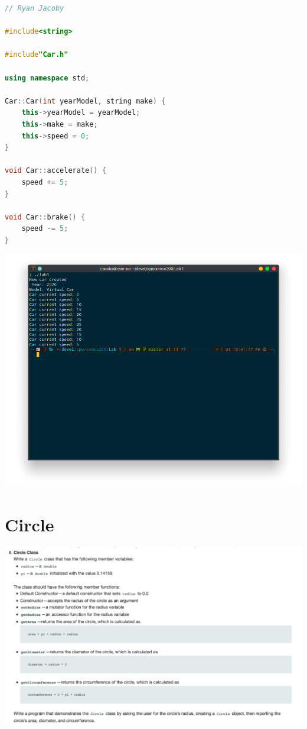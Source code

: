 \documentclass[letterpaper, 11pt]{article}
\begin{document}
\begin{lstlisting}[language=C++, caption=CarImp.cpp]
// Ryan Jacoby

#include<string>

#include"Car.h"

using namespace std;

Car::Car(int yearModel, string make) {
    this->yearModel = yearModel;
    this->make = make;
    this->speed = 0;
}

void Car::accelerate() {
    speed += 5;
}

void Car::brake() {
    speed -= 5;
}
\end{lstlisting}

\includegraphics[scale=0.5]{car_run.png} 

\section{Circle}

\includegraphics[scale=0.35]{circle.png} 
\end{document}
